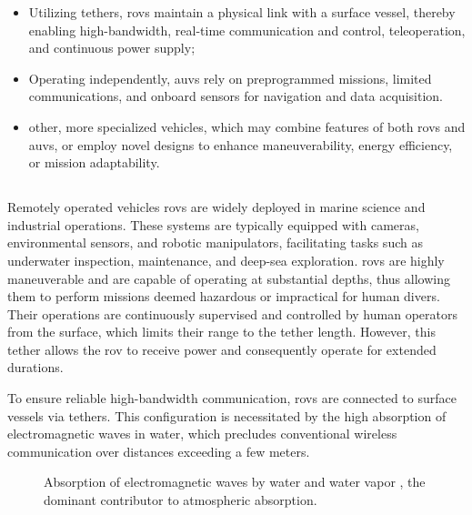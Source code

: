 \begin{itemize}
	\item Utilizing tethers, \acp{rov} maintain a physical link with a surface vessel, thereby enabling
	      high-bandwidth, real-time communication and control, teleoperation, and continuous power supply;
	\item Operating independently, \acp{auv} rely on preprogrammed missions, limited communications, and
	      onboard sensors for navigation and data acquisition.
	\item other, more specialized vehicles, which may combine features of both \acp{rov} and \acp{auv}, or
	      employ novel designs to enhance maneuverability, energy efficiency, or mission adaptability.
\end{itemize}

\subsection{}
\label{sota_uuv_remotely_operated_vehicles}

Remotely operated vehicles \acp{rov} are widely deployed in marine science and industrial
operations. These systems are typically equipped with cameras, environmental sensors, and robotic
manipulators, facilitating tasks such as underwater inspection, maintenance, and deep-sea
exploration. \Acp{rov} are highly maneuverable and are capable of operating at substantial depths,
thus allowing them to perform missions deemed hazardous or impractical for human divers. Their
operations are continuously supervised and controlled by human operators from the surface, which
limits their range to the tether length. However, this tether allows the \ac{rov} to receive power
and consequently operate for extended durations.

To ensure reliable high-bandwidth communication, \acp{rov} are connected to surface vessels via
tethers. This configuration is necessitated by the high absorption of electromagnetic waves in
water, which precludes conventional wireless communication over distances exceeding a few meters.

\begin{figure}
	\centering
	\caption{
		Absorption of electromagnetic waves by water \parencite{downingOpticalConstantsWater1975} and water
		vapor \parencite{rothmanHITRAN2004Molecular2005}, the dominant contributor to atmospheric absorption.
	}
	\label{sota_uuv_rov_absorption_spectrum}
\end{figure}

